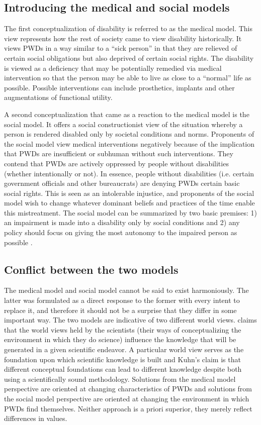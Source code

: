 \documentclass[a4paper]{article}
\begin{document}
\subsection{Introducing the medical and social models} 
\label{models}

The first conceptualization of disability is referred to as the medical model.
This view represents how the rest of society came to view disability
historically. It views PWDs in a way similar to a ``sick person'' in that they
are relieved of certain social obligations but also deprived of certain social
rights. The disability is viewed as a deficiency that may be potentially
remedied via medical intervention so that the person may be able to live as
close to a ``normal'' life as possible. Possible interventions can include
prosthetics, implants and other augmentations of functional utility.

A second conceptualization that came as a reaction to the medical model is the
social model. It offers a social constructionist view of the situation whereby
a person is rendered disabled only by societal conditions and norms.
Proponents of the social model view medical interventions negatively because
of the implication that PWDs are insufficient or subhuman without such
interventions. They contend that PWDs are actively oppressed by people without
disabilities (whether intentionally or not). In essence, people without
disabilities (i.e. certain government officials and other bureaucrats) are
denying PWDs certain basic social rights. This is seen as an intolerable
injustice, and proponents of the social model wish to change whatever dominant
beliefs and practices of the time enable this mistreatment. The social model
can be summarized by two basic premises: 1) an impairment is made into a
disability only by social conditions and 2) any policy should focus on giving
the most autonomy to the impaired person as possible
\citep{winter2003development}.


\subsection{Conflict between the two models}

The medical model and social model cannot be said to exist harmoniously. The
latter was formulated as a direct response to the former with every intent to
replace it, and therefore it should not be a surprise that they differ in some
important way. The two models are indicative of two different world views.
\cite{kuhn1970structure} claims that the world views held by the scientists
(their ways of conceptualizing the environment in which they do science)
influence the knowledge that will be generated in a given scientific endeavor.
A particular world view serves as the foundation upon which scientific
knowledge is built and Kuhn's claim is that different conceptual foundations
can lead to different knowledge despite both using a scientifically sound
methodology. Solutions from the medical model perspective are oriented at
changing characteristics of PWDs and solutions from the social model
perspective are oriented at changing the environment in which PWDs find
themselves. Neither approach is a priori superior, they merely reflect
differences in values.
\end{document}
